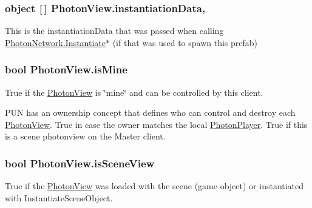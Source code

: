 \subsubsection[{\texorpdfstring{instantiation\+Data}{instantiationData}}]{\setlength{\rightskip}{0pt plus 5cm}object \mbox{[}$\,$\mbox{]} Photon\+View.\+instantiation\+Data\hspace{0.3cm}{\ttfamily [get]}, {\ttfamily [set]}}\hypertarget{class_photon_view_a0d1e63579ed533e6394ca7f12b313c7c}{}\label{class_photon_view_a0d1e63579ed533e6394ca7f12b313c7c}


This is the instantiation\+Data that was passed when calling \hyperlink{class_photon_network_a843d9f62d28ab123c83291c1e6bb857d}{Photon\+Network.\+Instantiate}$\ast$ (if that was used to spawn this prefab) 

\subsubsection[{\texorpdfstring{is\+Mine}{isMine}}]{\setlength{\rightskip}{0pt plus 5cm}bool Photon\+View.\+is\+Mine\hspace{0.3cm}{\ttfamily [get]}}\hypertarget{class_photon_view_a823593ba0cf86454176b4f0d04a70590}{}\label{class_photon_view_a823593ba0cf86454176b4f0d04a70590}


True if the \hyperlink{class_photon_view}{Photon\+View} is \char`\"{}mine\char`\"{} and can be controlled by this client. 

P\+UN has an ownership concept that defines who can control and destroy each \hyperlink{class_photon_view}{Photon\+View}. True in case the owner matches the local \hyperlink{class_photon_player}{Photon\+Player}. True if this is a scene photonview on the Master client. 
\subsubsection[{\texorpdfstring{is\+Scene\+View}{isSceneView}}]{\setlength{\rightskip}{0pt plus 5cm}bool Photon\+View.\+is\+Scene\+View\hspace{0.3cm}{\ttfamily [get]}}\hypertarget{class_photon_view_a65ea130a5d46f64984ff5361518f6050}{}\label{class_photon_view_a65ea130a5d46f64984ff5361518f6050}


True if the \hyperlink{class_photon_view}{Photon\+View} was loaded with the scene (game object) or instantiated with Instantiate\+Scene\+Object. 

